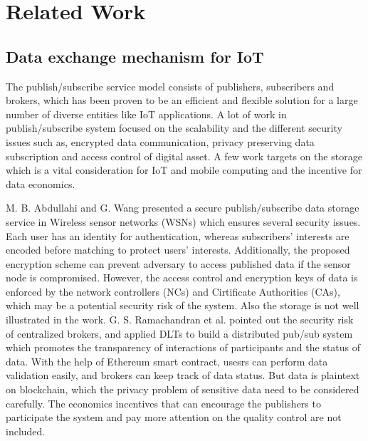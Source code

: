 \documentclass[conference]{IEEEtran}
\begin{document}
\section{Related Work}
\label{section:relatedWork}
\subsection{Data exchange mechanism for IoT}
The publish/subscribe service model consists of publishers, subscribers and brokers, which has been proven\cite{pubSubAnalysis, pubSubAnalysis2} to be an efficient and flexible solution for a large number of diverse entities like IoT applications. A lot of work in publish/subscribe system focused on the scalability and the different security issues such as, encrypted data communication, privacy preserving data subscription and access control of digital asset. A few work targets on the storage which is a vital consideration for IoT and mobile computing and the incentive for data economics.

M. B. Abdullahi and G. Wang\cite{centralPubSub} presented a secure publish/subscribe data storage service in Wireless sensor networks (WSNs) which ensures several security issues. Each user has an identity for authentication, whereas subscribers' interests are encoded before matching to protect users' interests. Additionally, the proposed encryption scheme can prevent adversary to access published data if the sensor node is compromised. However, the access control and encryption keys of data is enforced by the network controllers (NCs) and Cirtificate Authorities (CAs), which may be a potential security risk of the system. Also the storage is not well illustrated in the work. G. S. Ramachandran et al.\cite{trinity} pointed out the security risk of centralized brokers, and applied DLTs to build a distributed pub/sub system which promotes the transparency of interactions of participants and the status of data. With the help of Ethereum smart contract, usesrs can perform data validation easily, and brokers can keep track of data status. But data is plaintext on blockchain, which the privacy problem of sensitive data need to be considered carefully. The economics incentives that can encourage the publishers to participate the system and pay more attention on the quality control are not included. 
\end{document}
